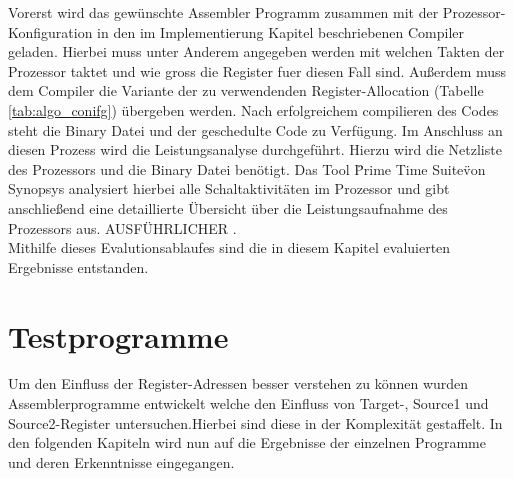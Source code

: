 Vorerst wird das gewünschte Assembler Programm zusammen mit der Prozessor-Konfiguration in den im Implementierung Kapitel beschriebenen Compiler geladen. Hierbei muss unter Anderem angegeben werden mit welchen Takten der Prozessor taktet und wie gross die Register fuer diesen Fall sind. Außerdem muss dem Compiler die Variante der zu verwendenden Register-Allocation (Tabelle \ref{tab:algo_conifg}) übergeben werden. Nach erfolgreichem compilieren des Codes steht die Binary Datei und der geschedulte Code zu Verfügung. Im Anschluss an diesen Prozess wird die Leistungsanalyse durchgeführt. Hierzu wird die Netzliste des Prozessors und die Binary Datei benötigt. Das Tool \"Prime Time Suite\" von Synopsys analysiert hierbei alle Schaltaktivitäten im Prozessor und gibt anschließend eine detaillierte Übersicht über die Leistungsaufnahme des Prozessors aus. AUSFÜHRLICHER .\\ 
Mithilfe dieses Evalutionsablaufes sind die in diesem Kapitel evaluierten Ergebnisse entstanden.
\section{Testprogramme}
Um den Einfluss der Register-Adressen besser verstehen zu können wurden Assemblerprogramme entwickelt welche den Einfluss von Target-, Source1 und Source2-Register untersuchen.Hierbei sind diese in der Komplexität gestaffelt. In den folgenden Kapiteln wird nun auf die Ergebnisse der einzelnen Programme und deren Erkenntnisse eingegangen.
